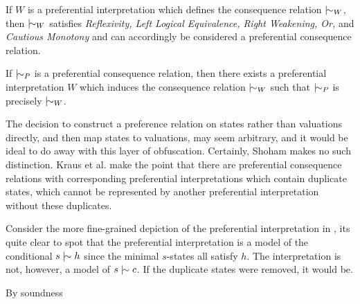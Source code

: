 \begin{theorem}[Soundness]
	\label{theorem:soundness-preferential}

	If $W$ is a preferential interpretation which defines the consequence relation $\twiddle_{W}$, then $\twiddle_{W}$ satisfies
	\textit{Reflexivity, Left Logical Equivalence, Right Weakening, Or,} and \textit{Cautious Monotony} and can accordingly
	be considered a preferential consequence relation.
\end{theorem}

\begin{theorem}[Completeness]
	\label{theorem:completeness-preferential}

	If $\twiddle_{P}$ is a preferential consequence relation, then there exists a preferential interpretation $W$ which induces
	the consequence relation $\twiddle_{W}$ such that $\twiddle_{P}$ is precisely $\twiddle_{W}$.
\end{theorem}

The decision to construct a preference relation on states rather than valuations directly, and then map states to valuations,
may seem arbitrary, and it would be ideal to do away with this layer of obfuscation. Certainly, Shoham \cite{shohamSemanticApproach}
makes no such distinction. Kraus et al. \cite{kraus1990nonmonotonic} make the point that there are preferential consequence
relations with corresponding preferential interpretations which contain duplicate states, which cannot be represented by
another preferential interpretation without these duplicates.

\begin{example}
	Consider the more fine-grained depiction of the preferential interpretation in ,
	its quite clear to spot that the preferential interpretation is a model of the conditional $s \twiddle h$ since the
	minimal $s$-states all satisfy $h$. The interpretation is not, however, a model of $s \twiddle c$. If the duplicate
	states were removed, it would be.
	\begin{figure}[H]
		\centering
	\end{figure}
	By soundness
\end{example}

